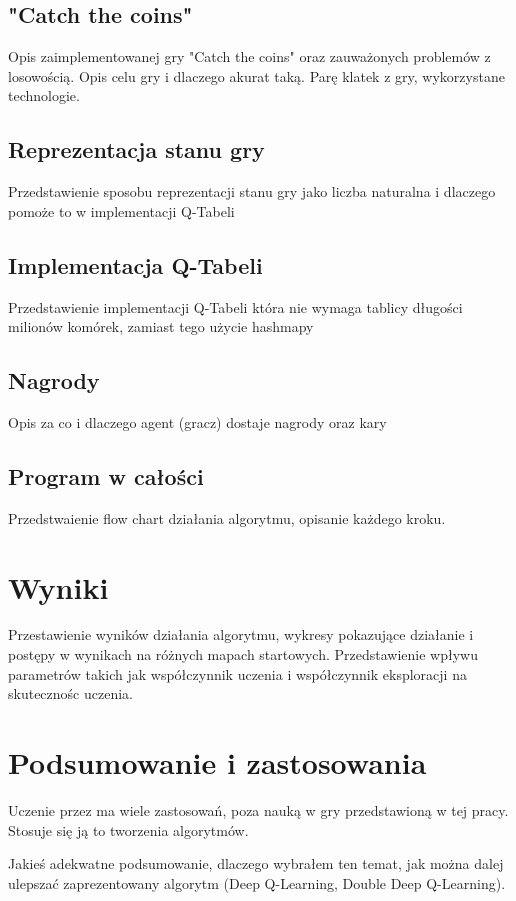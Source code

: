 \documentclass[a4paper,12pt]{article}
\begin{document}
\subsection{"Catch the coins"}

Opis zaimplementowanej gry "Catch the coins" oraz zauważonych problemów z losowością. Opis celu gry i dlaczego akurat taką. Parę klatek z gry, wykorzystane technologie.

\subsection{Reprezentacja stanu gry}

Przedstawienie sposobu reprezentacji stanu gry jako liczba naturalna i dlaczego pomoże to w implementacji Q-Tabeli

\subsection{Implementacja Q-Tabeli}

Przedstawienie implementacji Q-Tabeli która nie wymaga tablicy długości milionów komórek, zamiast tego użycie hashmapy

\subsection{Nagrody}

Opis za co i dlaczego agent (gracz) dostaje nagrody oraz kary

\subsection{Program w całości}

Przedstwaienie flow chart działania algorytmu, opisanie każdego kroku.

\section{Wyniki}

Przestawienie wyników działania algorytmu, wykresy pokazujące działanie i postępy w wynikach na różnych mapach startowych. Przedstawienie wpływu parametrów takich jak współczynnik uczenia i współczynnik eksploracji na skutecznośc uczenia.

\section{Podsumowanie i zastosowania}

Uczenie przez ma wiele zastosowań, poza nauką w gry przedstawioną w tej pracy. Stosuje się ją to tworzenia algorytmów.

 Jakieś adekwatne podsumowanie, dlaczego wybrałem ten temat, jak można dalej ulepszać zaprezentowany algorytm (Deep Q-Learning, Double Deep Q-Learning).
\end{document}

